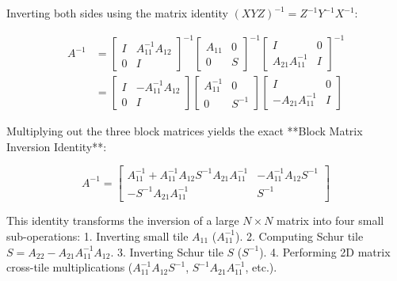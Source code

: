 Inverting both sides using the matrix identity $(X Y Z)^{-1} = Z^{-1} Y^{-1} X^{-1}$:

\begin{align}
A^{-1} &= \begin{bmatrix} I & A_{11}^{-1} A_{12} \\ 0 & I \end{bmatrix}^{-1} \begin{bmatrix} A_{11} & 0 \\ 0 & S \end{bmatrix}^{-1} \begin{bmatrix} I & 0 \\ A_{21} A_{11}^{-1} & I \end{bmatrix}^{-1} \\
&= \begin{bmatrix} I & -A_{11}^{-1} A_{12} \\ 0 & I \end{bmatrix} \begin{bmatrix} A_{11}^{-1} & 0 \\ 0 & S^{-1} \end{bmatrix} \begin{bmatrix} I & 0 \\ -A_{21} A_{11}^{-1} & I \end{bmatrix}
\end{align}

Multiplying out the three block matrices yields the exact **Block Matrix Inversion Identity**:

\begin{mathbox}
\begin{equation}
A^{-1} = \begin{bmatrix} 
A_{11}^{-1} + A_{11}^{-1} A_{12} S^{-1} A_{21} A_{11}^{-1} & -A_{11}^{-1} A_{12} S^{-1} \\ 
-S^{-1} A_{21} A_{11}^{-1} & S^{-1} 
\end{bmatrix}
\end{equation}
\end{mathbox}

This identity transforms the inversion of a large $N \times N$ matrix into four small sub-operations:
1. Inverting small tile $A_{11}$ ($A_{11}^{-1}$).
2. Computing Schur tile $S = A_{22} - A_{21} A_{11}^{-1} A_{12}$.
3. Inverting Schur tile $S$ ($S^{-1}$).
4. Performing 2D matrix cross-tile multiplications ($A_{11}^{-1} A_{12} S^{-1}$, $S^{-1} A_{21} A_{11}^{-1}$, etc.).


